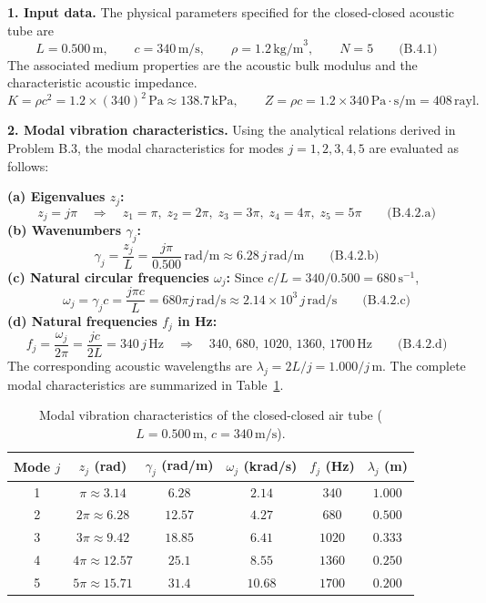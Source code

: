 \textbf{1. Input data.} The physical parameters specified for the closed-closed acoustic tube are
\[
\boxed{L=0.500\,\mathrm{m},\qquad c=340\,\mathrm{m/s},\qquad \rho=1.2\,\mathrm{kg/m}^3,\qquad N=5}\qquad\text{(B.4.1)}
\]
The associated medium properties are the acoustic bulk modulus and the characteristic acoustic impedance.
\[
K=\rho c^2=1.2\times(340)^2\,\mathrm{Pa}\approx138.7\,\mathrm{kPa},
\qquad
Z=\rho c=1.2\times 340\,\mathrm{Pa\cdot s/m}=408\,\mathrm{rayl}.
\]

\textbf{2. Modal vibration characteristics.} Using the analytical relations derived in Problem B.3, the modal characteristics for modes $j=1,2,3,4,5$ are evaluated as follows:
\par\smallskip\noindent
\textbf{(a) Eigenvalues $z_j$:}
\[
\boxed{z_j=j\pi\quad\Longrightarrow\quad z_1=\pi,\; z_2=2\pi,\; z_3=3\pi,\; z_4=4\pi,\; z_5=5\pi}\qquad\text{(B.4.2.a)}
\]
\textbf{(b) Wavenumbers $\gamma_j$:}
\[
\boxed{\gamma_j=\frac{z_j}{L}=\frac{j\pi}{0.500}\,\mathrm{rad/m}\approx 6.28\,j\,\mathrm{rad/m}}\qquad\text{(B.4.2.b)}
\]
\textbf{(c) Natural circular frequencies $\omega_j$:} Since $c/L=340/0.500=680\,\mathrm{s}^{-1}$,
\[
\boxed{\omega_j=\gamma_j c=\frac{j\pi c}{L}=680\pi j\,\mathrm{rad/s}\approx 2.14\times10^3\,j\,\mathrm{rad/s}}\qquad\text{(B.4.2.c)}
\]
\textbf{(d) Natural frequencies $f_j$ in Hz:}
\[
\boxed{f_j=\frac{\omega_j}{2\pi}=\frac{jc}{2L}=340\,j\,\mathrm{Hz}\quad\Longrightarrow\quad 340,\,680,\,1020,\,1360,\,1700\,\mathrm{Hz}}\qquad\text{(B.4.2.d)}
\]
The corresponding acoustic wavelengths are $\lambda_j=2L/j=1.000/j\,\mathrm{m}$. The complete modal characteristics are summarized in Table~\ref{tab:hw02-b4-modal}.

\begin{table}[H]
\centering
\caption{Modal vibration characteristics of the closed-closed air tube ($L=0.500\,\mathrm{m}$, $c=340\,\mathrm{m/s}$).}
\label{tab:hw02-b4-modal}
\smallskip
\small
\begin{tabular}{@{}cccccc@{}}
\toprule
Mode $j$ & $z_j$ (rad) & $\gamma_j$ (rad/m) & $\omega_j$ (krad/s) & $f_j$ (Hz) & $\lambda_j$ (m) \\
\midrule
1 & $\pi\approx 3.14$ & $6.28$ & $2.14$ & $340$ & $1.000$ \\
2 & $2\pi\approx 6.28$ & $12.57$ & $4.27$ & $680$ & $0.500$ \\
3 & $3\pi\approx 9.42$ & $18.85$ & $6.41$ & $1020$ & $0.333$ \\
4 & $4\pi\approx 12.57$ & $25.1$ & $8.55$ & $1360$ & $0.250$ \\
5 & $5\pi\approx 15.71$ & $31.4$ & $10.68$ & $1700$ & $0.200$ \\
\bottomrule
\end{tabular}
\end{table}

